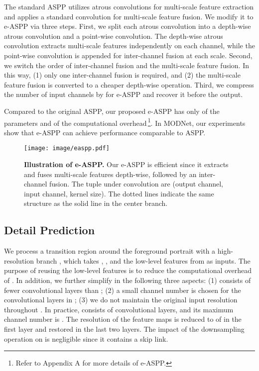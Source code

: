 \documentclass[letterpaper]{article} \usepackage{aaai22}  \usepackage{times}  \usepackage{helvet}  \usepackage{courier}  \usepackage[hyphens]{url}  \usepackage{graphicx} \urlstyle{rm} \def\UrlFont{\rm}  \usepackage{natbib}  \usepackage{caption} \usepackage{booktabs}
\begin{document}
The standard ASPP utilizes atrous convolutions for multi-scale feature extraction and applies a standard convolution for multi-scale feature fusion.
We modify it to e-ASPP via three steps. 
First, we split each atrous convolution into a depth-wise atrous convolution and a point-wise convolution. The depth-wise atrous convolution extracts multi-scale features independently on each channel, while the point-wise convolution is appended for inter-channel fusion at each scale.
Second, we switch the order of inter-channel fusion and the multi-scale feature fusion. In this way,  (1) only one inter-channel fusion is required, and (2) the multi-scale feature fusion is converted to a cheaper depth-wise operation.
Third, we compress the number of input channels by  for e-ASPP and recover it before the output. 

Compared to the original ASPP, our proposed e-ASPP has only  of the parameters and  of the computational overhead\,\footnote{Refer to Appendix A for more details of e-ASPP.}. In MODNet, our experiments show that e-ASPP can achieve performance comparable to ASPP.


\begin{figure}[t]
\begin{center}
  \texttt{[image: image/easpp.pdf]}
\end{center}
  \caption{\textbf{Illustration of e-ASPP.} Our e-ASPP is efficient since it extracts and fuses multi-scale features depth-wise, followed by an inter-channel fusion. 
  The tuple under convolution are (output channel, input channel, kernel size). The dotted lines indicate the same structure as the solid line in the center branch.
  }
\label{fig:eASPP}
\end{figure}


\subsection{Detail Prediction}\label{sec:3_3}
We process a transition region around the foreground portrait with a high-resolution branch , which takes , , and the low-level features from  as inputs. The purpose of reusing the low-level features is to reduce the computational overhead of . In addition, we further simplify  in the following three aspects: (1)  consists of fewer convolutional layers than ; (2) a small channel number is chosen for the convolutional layers in ; (3) we do not maintain the original input resolution throughout . In practice,  consists of  convolutional layers, and its maximum channel number is . The resolution of the feature maps is reduced to  of  in the first layer and restored in the last two layers. 
The impact of the downsampling operation on  is negligible since it contains a skip link.
\end{document}
